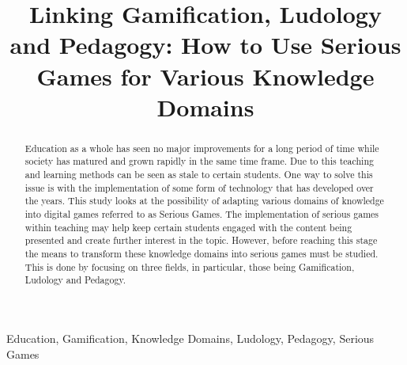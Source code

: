 \documentclass[conference]{IEEEtran}
\begin{document}
\title{Linking Gamification, Ludology and Pedagogy: How to Use Serious Games for Various Knowledge Domains\\

}

\author{
\and


}

\maketitle

\begin{abstract}
Education as a whole has seen no major improvements for a long period of time while society has matured and grown rapidly in the same time frame. Due to this teaching and learning methods can be seen as stale to certain students. One way to solve this issue is with the implementation of some form of technology that has developed over the years. This study looks at the possibility of adapting various domains of knowledge into digital games referred to as Serious Games. The implementation of serious games within teaching may help keep certain students engaged with the content being presented and create further interest in the topic. However, before reaching this stage the means to transform these knowledge domains into serious games must be studied. This is done by focusing on three fields, in particular, those being Gamification, Ludology and Pedagogy.
\end{abstract}

\begin{IEEEkeywords}
Education, Gamification, Knowledge Domains, Ludology, Pedagogy, Serious Games
\end{IEEEkeywords}
\end{document}
